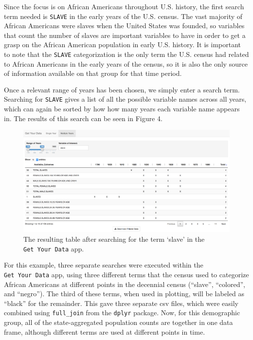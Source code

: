 \documentclass[11pt,]{article}
\begin{document}
Since the focus is on African Americans throughout U.S. history, the
first search term needed is \texttt{SLAVE} in the early years of the
U.S. census. The vast majority of African Americans were slaves when the
United States was founded, so variables that count the number of slaves
are important variables to have in order to get a grasp on the African
American population in early U.S. history. It is important to note that
the \texttt{SLAVE} categorization is the only term the U.S. census had
related to African Americans in the early years of the census, so it is
also the only source of information available on that group for that
time period.

Once a relevant range of years has been chosen, we simply enter a search
term. Searching for \texttt{SLAVE} gives a list of all the possible
variable names across all years, which can again be sorted by how how
many years each variable name appears in. The results of this search can
be seen in Figure 4.

\begin{figure}[htbp]
\centering
\includegraphics{./figures/app-sshot-slave.png}
\caption{The resulting table after searching for the term `slave' in the
\texttt{Get\ Your\ Data} app.}
\end{figure}

For this example, three separate searches were executed within the
\texttt{Get\ Your\ Data} app, using three different terms that the
census used to categorize African Americans at different points in the
decennial census (``slave'', ``colored'', and ``negro''). The third of
these terms, when used in plotting, will be labeled as ``black'' for the
remainder. This gave three separate csv files, which were easily
combined using \texttt{full\_join} from the \texttt{dplyr} package. Now,
for this demographic group, all of the state-aggregated population
counts are together in one data frame, although different terms are used
at different points in time.
\end{document}
